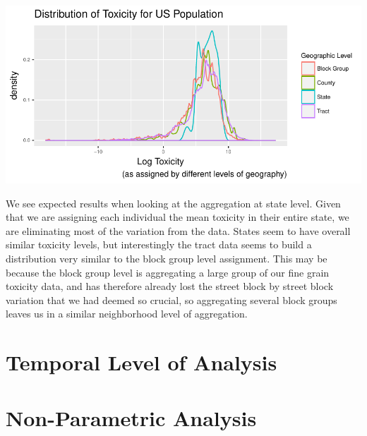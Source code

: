 \documentclass[12pt,twoside]{dukestatscithesis}
\theoremstyle{definition}
\theoremstyle{definition}
\theoremstyle{definition}
\theoremstyle{remark}
\begin{document}
\includegraphics{thesis_files/figure-latex/unnamed-chunk-2-1.pdf}

We see expected results when looking at the aggregation at state level.
Given that we are assigning each individual the mean toxicity in their
entire state, we are eliminating most of the variation from the data.
States seem to have overall similar toxicity levels, but interestingly
the tract data seems to build a distribution very similar to the block
group level assignment. This may be because the block group level is
aggregating a large group of our fine grain toxicity data, and has
therefore already lost the street block by street block variation that
we had deemed so crucial, so aggregating several block groups leaves us
in a similar neighborhood level of aggregation.

\section{Temporal Level of Analysis}\label{temporal-level-of-analysis}

\section{Non-Parametric Analysis}\label{non-parametric-analysis}
\end{document}
